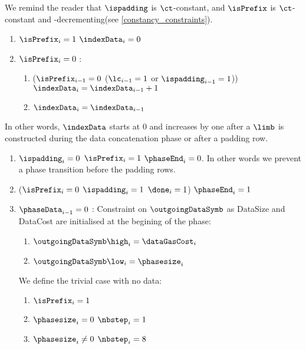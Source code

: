 \begin{center}
\end{center}

We remind the reader that $\ispadding$ is $\ct$-constant, and $\isPrefix$ is $\ct$-constant and \phaseData{}-decrementing(see \ref{constancy_constraints}).
\begin{enumerate}
    \item \If $\isPrefix_{i}=1$ \Then $\indexData_{i}=0$
    \item \If $\isPrefix_{i}=0$ \Then: 
    \begin{enumerate}
        \item \If ($\isPrefix_{i-1}=0$ \et ($\lc_{i-1}=1$ or $\ispadding_{i-1}=1$)) \Then $\indexData_{i}=\indexData_{i-1} + 1$
        \item \Else $\indexData_{i}=\indexData_{i-1}$
    \end{enumerate}
\end{enumerate}
In other words, $\indexData$ starts at 0 and increases by one after a $\limb$ is constructed during the data concatenation phase or after a padding row. %
\begin{enumerate}[resume]
    \item \If $\ispadding_{i} = 0$ \Or $\isPrefix_{i}=1$ \Then $\phaseEnd_{i}=0$. In other words we prevent a phase transition before the padding rows.
    \item \If ($\isPrefix_{i}=0$ \et $\ispadding_{i} = 1$ \et $\done_{i}=1$) \Then $\phaseEnd_{i}=1$
    \item \If $\phaseData_{i-1}=0$ \Then:
    Constraint on $\outgoingDataSymb$ as DataSize and DataCost are initialised at the begining of the phase:
    \begin{enumerate}
        \item $\outgoingDataSymb\high_{i}=\dataGasCost_{i}$
        \item $\outgoingDataSymb\low_{i}=\phasesize_{i}$
    \end{enumerate} 
    We define the trivial case with no data:
    \begin{enumerate}[resume]
        \item $\isPrefix_{i}=1$
        \item \If $\phasesize_{i}=0$ \Then $\nbstep_{i}=1$
        \item \If $\phasesize_{i} \neq 0$ \Then $\nbstep_{i}=8$ 
    \end{enumerate}
\end{enumerate}
